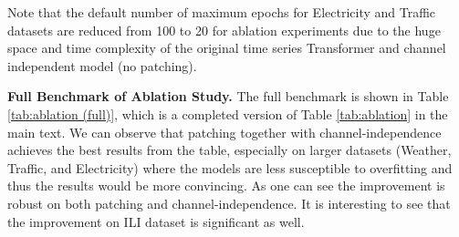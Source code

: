 \documentclass{article} %
\begin{document}
Note that the default number of maximum epochs for Electricity and Traffic datasets are reduced from 100 to 20 for ablation experiments due to the huge space and time complexity of the original time series Transformer and channel independent model (no patching).


\textbf{Full Benchmark of Ablation Study.}
The full benchmark is shown in Table \ref{tab:ablation (full)}, which is a completed version of Table \ref{tab:ablation} in the main text. We can observe that patching together with channel-independence achieves the best results from the table, especially on larger datasets (Weather, Traffic, and Electricity) where the models are less susceptible to overfitting and thus the results would be more convincing. As one can see the improvement is robust on both patching and channel-independence. It is interesting to see that the improvement on ILI dataset is significant as well.
\end{document}
